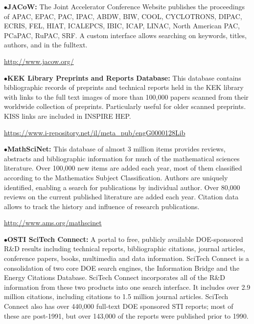 \item{$\bullet$}{\bf JACoW:}
The Joint Accelerator Conference Website publishes the proceedings of APAC, EPAC, PAC, IPAC, ABDW, BIW, COOL, CYCLOTRONS, DIPAC, ECRIS, FEL, HIAT, ICALEPCS, IBIC, ICAP, LINAC, North American PAC, PCaPAC, RuPAC, SRF. A custom interface allows searching on keywords, titles, authors, and in the fulltext.

   \item{}\qquad\url{http://www.jacow.org/}
\medskip

\item{$\bullet$}{\bf KEK Library Preprints and Reports Database:}
This database contains bibliographic records of preprints and technical reports held in the KEK library with links to the full text images of more than 100,000 papers scanned from their worldwide collection of preprints. Particularly useful for older scanned preprints. KISS links are included in INSPIRE HEP.
   \item{}\qquad\url{https://www.i-repository.net/il/meta\_pub/engG0000128Lib}
\medskip

\item{$\bullet$}{\bf MathSciNet:}
This database of almost 3 million items provides reviews, abstracts and bibliographic information for much of the mathematical sciences literature. Over 100,000 new items are added each year, most of them classified according to the Mathematics Subject Classification. Authors are uniquely identified, enabling a search for publications by individual author. Over 80,000 reviews on the current published literature are added each year. Citation data allows to track the history and influence of research publications.
   \item{}\qquad\url{http://www.ams.org/mathscinet}
\medskip

\item{$\bullet$}{\bf OSTI SciTech Connect:}
A portal to free, publicly available DOE-sponsored R\&D results including technical reports, bibliographic citations, journal articles, conference papers, books, multimedia and data information. SciTech Connect is a consolidation of two core DOE search engines, the Information Bridge and the Energy Citations Database. SciTech Connect incorporates all of the R\&D information from these two products into one search interface. It includes over 2.9 million citations, including citations to 1.5 million journal articles. SciTech Connect also has over 440,000 full-text DOE sponsored STI reports; most of these are post-1991, but over 143,000 of the reports were published prior to 1990.

